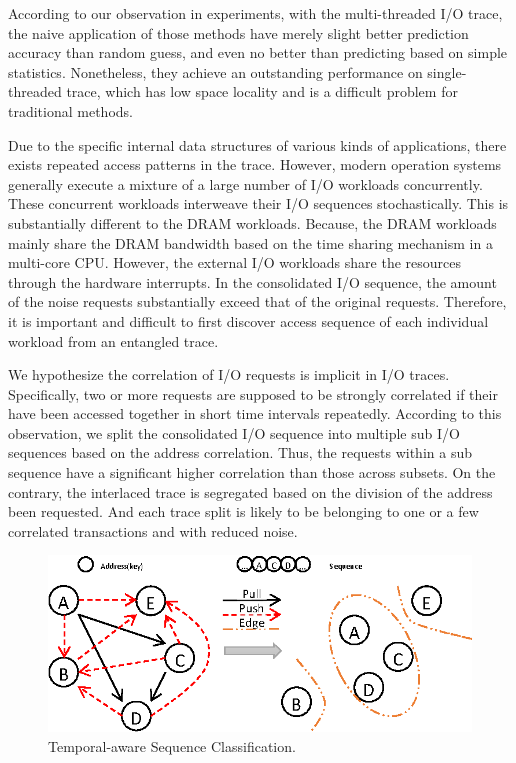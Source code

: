 According to our observation in experiments, with the multi-threaded I/O trace,
the naive application of those methods have merely slight better prediction accuracy than random guess,
and even no better than predicting based on simple statistics.
Nonetheless, they achieve an outstanding performance on single-threaded trace,
which has low space locality and is a difficult problem for traditional methods.

Due to the specific internal data structures of various kinds of applications,
there exists repeated access patterns in the trace.
However, modern operation systems generally execute a mixture of a large number of I/O workloads concurrently.
These concurrent workloads interweave their I/O sequences stochastically.
This is substantially different to the DRAM workloads.
Because, the DRAM workloads mainly share the DRAM bandwidth based on the time sharing mechanism in a multi-core CPU.
However, the external I/O workloads share the resources through the hardware interrupts.
In the consolidated I/O sequence, the amount of the noise requests substantially exceed that of the original requests.
Therefore, it is important and difficult to first discover access sequence of each individual workload from an entangled trace.

We hypothesize the correlation of I/O requests is implicit in I/O traces.
Specifically, two or more requests are supposed to be strongly correlated if their have been accessed together in short time intervals repeatedly.
According to this observation, we split the consolidated I/O sequence into multiple sub I/O sequences based on the address correlation.
Thus, the requests within a sub sequence have a significant higher correlation than those across subsets.
On the contrary, the interlaced trace is segregated based on the division of the address been requested.
And each trace split is likely to be belonging to one or a few correlated transactions and with reduced noise.

\begin{figure}[h]
\centering
\includegraphics[width=0.9\linewidth]{fig/sequence_grouping.eps}
\caption{Temporal-aware Sequence Classification.}
\label{fig:sequence_grouping}
\end{figure}

